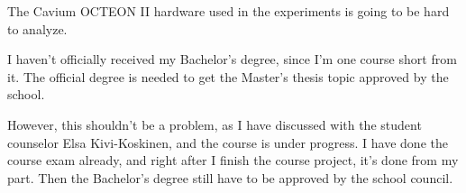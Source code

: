 The Cavium OCTEON II hardware used in the experiments is going to be hard to analyze.

I haven't officially received my Bachelor's degree, since I'm one course short from it. The official degree is needed to get the Master's thesis topic approved by the school.

However, this shouldn't be a problem, as I have discussed with the student counselor Elsa Kivi-Koskinen, and the course is under progress. I have done the course exam already, and right after I finish the course project, it's done from my part. Then the Bachelor's degree still have to be approved by the school council.

